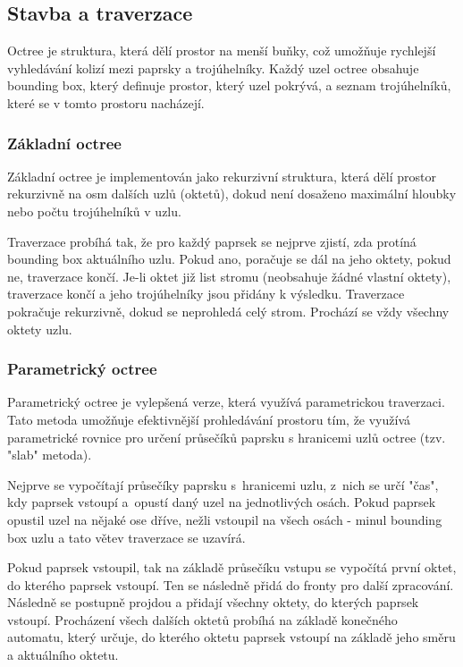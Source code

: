 \documentclass[10pt,a4paper]{article}
\begin{document}
\subsection{Stavba a traverzace}

Octree je struktura, která dělí prostor na menší buňky, což umožňuje rychlejší vyhledávání kolizí mezi paprsky a trojúhelníky. Každý uzel octree obsahuje bounding box, který definuje prostor, který uzel pokrývá, a seznam trojúhelníků, které se v tomto prostoru nacházejí.

\subsubsection{Základní octree}

Základní octree je implementován jako rekurzivní struktura, která dělí prostor rekurzivně na osm dalších uzlů (oktetů), dokud není dosaženo maximální hloubky nebo počtu trojúhelníků v uzlu.

Traverzace probíhá tak, že pro každý paprsek se nejprve zjistí, zda protíná bounding box aktuálního uzlu. Pokud ano, poračuje se dál na jeho oktety, pokud ne, traverzace končí. Je-li oktet již list stromu (neobsahuje žádné vlastní oktety), traverzace končí a jeho trojúhelníky jsou přidány k výsledku. Traverzace pokračuje rekurzivně, dokud se neprohledá celý strom. Prochází se vždy všechny oktety uzlu.

\subsubsection{Parametrický octree}

Parametrický octree je vylepšená verze, která využívá parametrickou traverzaci. Tato metoda umožňuje efektivnější prohledávání prostoru tím, že využívá parametrické rovnice pro určení průsečíků paprsku s hranicemi uzlů octree (tzv. "slab" metoda).

Nejprve se vypočítají průsečíky paprsku s~hranicemi uzlu, z~nich se určí "čas", kdy paprsek vstoupí a~opustí daný uzel na jednotlivých osách. Pokud paprsek opustil uzel na nějaké ose dříve, nežli vstoupil na všech osách - minul bounding box uzlu a tato větev traverzace se uzavírá.

Pokud paprsek vstoupil, tak na základě průsečíku vstupu se vypočítá první oktet, do kterého paprsek vstoupí. Ten se následně přidá do fronty pro další zpracování. Následně se postupně projdou a přidají všechny oktety, do kterých paprsek vstoupí. Procházení všech dalších oktetů probíhá na základě konečného automatu, který určuje, do kterého oktetu paprsek vstoupí na základě jeho směru a aktuálního oktetu.
\end{document}
